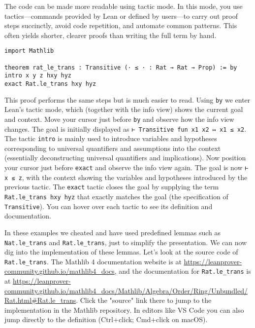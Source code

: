 \begin{example}
The code can be made more readable using tactic mode.
In this mode, you use tactics—commands provided by Lean or defined by users—to
carry out proof steps succinctly, avoid code repetition,
and automate common patterns.
This often yields shorter, clearer proofs than writing the full term by hand.
\begin{lstlisting}[language=lean]
import Mathlib

theorem rat_le_trans : Transitive (· ≤ · : Rat → Rat → Prop) := by
intro x y z hxy hyz
exact Rat.le_trans hxy hyz
\end{lstlisting}
This proof performs the same steps but is much easier to read.
Using \lstinline[language=lean]|by| we enter Lean's tactic mode,
which (together with the info view)
shows the current goal and context.
Move your cursor just before \lstinline[language=lean]|by|
and observe how the info view changes.
The goal is initially displayed as \lstinline[language=lean]|⊢ Transitive fun x1 x2 ↦ x1 ≤ x2|.
The tactic \lstinline[language=lean]|intro| is mainly used to introduce
variables and hypotheses corresponding to universal quantifiers
and assumptions into the context (essentially deconstructing universal quantifiers and implications).
Now position your cursor just before \lstinline[language=lean]|exact|
and observe the info view again.
The goal is now \lstinline[language=lean]|⊢ x ≤ z|, with the context
showing the variables and hypotheses introduced by the previous tactic.
The \lstinline[language=lean]|exact| tactic closes the goal
by supplying the term \lstinline[language=lean]|Rat.le_trans hxy hyz| that exactly matches the goal
(the specification of \lstinline[language=lean]|Transitive|).
You can hover over each tactic to see its definition and documentation.
\end{example}
In these examples we cheated and have used predefined lemmas such as
\lstinline[language=lean]|Nat.le_trans| and
\lstinline[language=lean]|Rat.le_trans|, just to simplify the presentation.
We can now dig into the implementation of these lemmas.
Let's look at the source code of \lstinline[language=lean]|Rat.le_trans|.
The Mathlib 4 documentation website is at
\url{https://leanprover-community.github.io/mathlib4_docs}, and
the documentation for
\lstinline[language=lean]|Rat.le_trans| is at
\url{https://leanprover-community.github.io/mathlib4_docs/Mathlib/Algebra/Order/Ring/Unbundled/Rat.html#Rat.le_trans}.
Click the "source" link there to jump to the implementation in the Mathlib repository. In editors like
VS Code you can also jump directly to the definition (Ctrl+click; Cmd+click on macOS).
